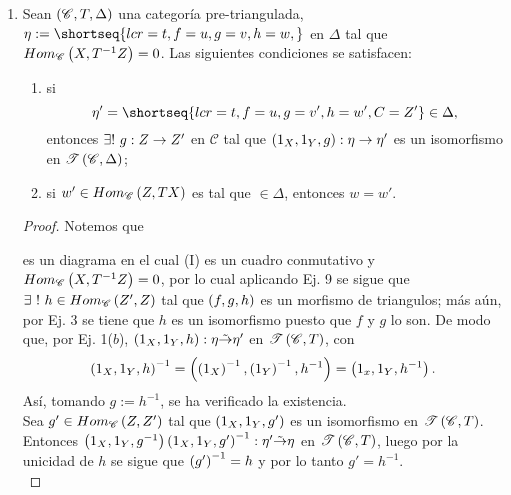 \documentclass{article}
\begin{document}
\begin{enumerate}[label=\textbf{Ej \arabic*.}]
\begin{proof}
			
		\end{proof}
		\item Sean $\left(\mathscr{C},T,\Delta\right)$ una categoría pre-triangulada, $\eta:=\shortseq{lcr=t,f=u,g=v,h=w,}$ en $\Delta$ tal que $Hom_{\mathscr{C}}\left(X,T^{-1}Z\right)=0$. Las siguientes condiciones se satisfacen:
		\begin{enumerate}[label=(\textit{\alph*})]
			\item si \begin{equation*}
				\eta'=\shortseq{lcr=t,f=u,g=v',h=w',C=Z'}\in\Delta,
			\end{equation*}
		 entonces $\exists !\ \catarrow{g}{Z}{Z'}{}$ en $\mathscr{C}$ tal que $\catarrow{\lrprth{1_X,1_Y,g}}{\eta}{\eta'}{}$ es un isomorfismo en $\mathscr{T}\left(\mathscr{C},\Delta\right)$;
			\item si $w'\in Hom_{\mathscr{C}}\left(Z,TX\right)$ es tal que $\in\Delta$, entonces $w=w'$.
		\end{enumerate}
		\begin{proof}
			 Notemos que 
			\begin{center}
			\end{center}
		es un diagrama en el cual (I) es un cuadro conmutativo y $Hom_{\mathscr{C}}\left(X,T^{-1}Z\right)=0$, por lo cual aplicando Ej. 9 se sigue que $\exists\ !\ h\in\ringmodhom{\mathscr{C}}{Z'}{Z}$ tal que $\left(f,g,h\right)$ es un morfismo de triangulos; más aún, por Ej. 3 se tiene que $h$ es un isomorfismo puesto que $f$ y $g$ lo son. De modo que, por Ej. 1($b$), $\catarrow{\lrprth{1_X,1_Y,h}}{\eta}{\eta'}{i}$ en $\mathscr{T}\left(\mathscr{C}, T\right)$,  con
		\begin{equation*}
			\left(1_X,1_Y,h\right)^{-1}=\left(\left(1_X\right)^{-1},\left(1_Y\right)^{-1},{h}^{-1}\right)=\left(1_x,1_Y,h^{-1}\right).
		\end{equation*}
		Así, tomando $g:=h^{-1}$, se ha verificado la existencia.\\
		
		Sea $g'\in Hom_{\mathscr{C}}\left(Z,Z'\right)$ tal que $\left(1_X,1_Y,g'\right)$ es un isomorfismo en $\mathscr{T}\left(\mathscr{C}, T\right)$. Entonces $\catarrow{\lrprth{1_X,1_Y,g^{-1}}\lrprth{1_X,1_Y,g'}^{-1}}{\eta'}{\eta}{i}$ en $\mathscr{T}\left(\mathscr{C}, T\right)$, luego por la unicidad de $h$ se sigue que $\left(g'\right)^{-1}=h$ y por lo tanto $g'=h^{-1}$.\\
		

\end{proof}
\end{enumerate}
\end{document}
